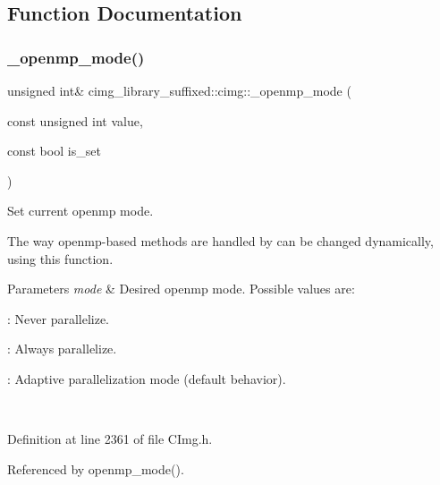 \subsection{Function Documentation}
\mbox{\label{namespacecimg__library__suffixed_1_1cimg_a2a1f404b2580ad14629ca49e7c5380e5}} 
\subsubsection{\texorpdfstring{\+\_\+openmp\+\_\+mode()}{\_openmp\_mode()}}
{\footnotesize\ttfamily unsigned int\& cimg\+\_\+library\+\_\+suffixed\+::cimg\+::\+\_\+openmp\+\_\+mode (\begin{DoxyParamCaption}\item[{const unsigned int}]{value,  }\item[{const bool}]{is\+\_\+set }\end{DoxyParamCaption})\hspace{0.3cm}{\ttfamily [inline]}}



Set current  openmp mode. 

The way openmp-\/based methods are handled by  can be changed dynamically, using this function. 
\begin{DoxyParams}{Parameters}
{\em mode} & Desired openmp mode. Possible values are\+:
\begin{DoxyItemize}
\item {}\+: Never parallelize.
\item {}\+: Always parallelize.
\item {}\+: Adaptive parallelization mode (default behavior). 
\end{DoxyItemize}\\
\hline
\end{DoxyParams}


Definition at line 2361 of file C\+Img.\+h.



Referenced by openmp\+\_\+mode().

